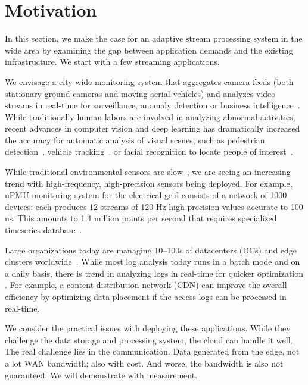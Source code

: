 \section{Motivation}
\label{sec:background-motivation}

In this section, we make the case for an adaptive stream processing system in
the wide area by examining the gap between application demands and the existing
infrastructure. We start with a few streaming applications.

 We envisage a city-wide monitoring system that
aggregates camera feeds (both stationary ground cameras and moving aerial
vehicles) and analyzes video streams in real-time for surveillance, anomaly
detection or business intelligence~\cite{oh2011large}. While traditionally human
labors are involved in analyzing abnormal activities, recent advances in
computer vision and deep learning has dramatically increased the accuracy for
automatic analysis of visual scenes, such as pedestrian
detection~\cite{dollar2012pedestrian}, vehicle tracking~\cite{coifman1998real},
or facial recognition to locate people of interest~\cite{parkhi2015deep,
  Lu:2015:SHF:2888116.2888245}. 

 While traditional environmental sensors are
slow~\cite{atzori2010internet}, we are seeing an increasing trend with
high-frequency, high-precision sensors being deployed. For example, uPMU
monitoring system for the electrical grid consists of a network of 1000 devices;
each produces 12 streams of 120 Hz high-precision values accurate to 100
ns. This amounts to 1.4 million points per second that requires specialized
timeseries database~\cite{andersen2016btrdb}.

 Large organizations today are managing 10--100s of
datacenters (DCs) and edge clusters worldwide~\cite{calder2013mapping}. While
most log analysis today runs in a batch mode and on a daily basis, there is
trend in analyzing logs in real-time for quicker optimization . For example, a content distribution network (CDN) can improve the
overall efficiency by optimizing data placement if the access logs can be
processed in real-time.

\vspace{0.5em}

We consider the practical issues with deploying these applications. While they
challenge the data storage and processing system, the cloud can handle it well.
The real challenge lies in the communication. Data generated from the edge, not
a lot WAN bandwidth; also with cost. And worse, the bandwidth is also not
guaranteed. We will demonstrate with measurement.

